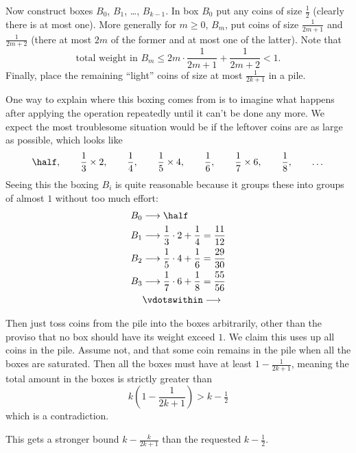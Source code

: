 \documentclass[11pt]{scrartcl}
\begin{document}
Now construct boxes $B_0$, $B_1$, \dots, $B_{k-1}$.
In box $B_0$ put any coins of size $\tfrac 12$ (clearly there is at most one).
More generally for $m \ge 0$, $B_m$, put coins of size
$\frac{1}{2m+1}$ and $\frac{1}{2m+2}$
(there at most $2m$ of the former and at most one of the latter).
Note that
\[ \text{total weight in $B_m$} \le 2m \cdot \frac{1}{2m+1} + \frac{1}{2m+2} < 1. \]
Finally, place the remaining ``light'' coins of size at most $\frac{1}{2k+1}$ in a pile.
\begin{remark*}
  One way to explain where this boxing comes from is to imagine
  what happens after applying the operation repeatedly until it can't be done any more.
  We expect the most troublesome situation would be if the leftover coins are
  as large as possible, which looks like
  \[ \half, \qquad \frac13 \times 2, \qquad \frac14, \qquad \frac15 \times 4,
    \qquad \frac16, \qquad \frac17 \times 6, \qquad \frac 18, \qquad \dots \]
  Seeing this the boxing $B_i$ is quite reasonable because it groups these
  into groups of almost $1$ without too much effort:
  \begin{align*}
    B_0 &\longrightarrow \half \\
    B_1 &\longrightarrow \frac13 \cdot 2 + \frac 14 = \frac{11}{12} \\
    B_2 &\longrightarrow \frac15 \cdot 4 + \frac 16 = \frac{29}{30} \\
    B_3 &\longrightarrow \frac17 \cdot 6 + \frac 18 = \frac{55}{56} \\
    &\vdotswithin\longrightarrow
  \end{align*}
\end{remark*}

Then just toss coins from the pile into the boxes arbitrarily,
other than the proviso that no box should have its weight exceed $1$.
We claim this uses up all coins in the pile.
Assume not, and that some coin remains in the pile
when all the boxes are saturated.
Then all the boxes must have at least $1 -\frac{1}{2k+1}$,
meaning the total amount in the boxes is strictly greater than
\[ k \left( 1 - \frac{1}{2k+1} \right) > k - \tfrac 12 \]
which is a contradiction.
\begin{remark*}
  This gets a stronger bound $k - \frac{k}{2k+1}$ than the requested $k-\tfrac 12$.
\end{remark*}
\pagebreak
\end{document}
